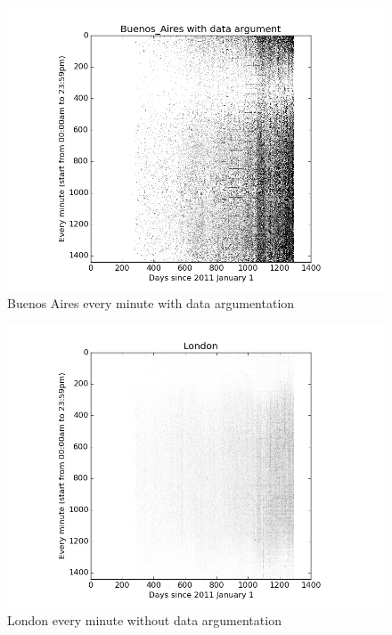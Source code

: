 \documentclass[a4paper,12pt]{article}
\begin{document}
\begin{figure}[H]
  \begin{center}
      \includegraphics[scale=0.8]{Buenos_Airesbinary.png}
\end{center}
\caption{Buenos Aires every minute with data argumentation}
 \label {fig:2}
 \end{figure}










\begin{figure}[H]
  \begin{center}
      \includegraphics[scale=0.8]{London.png}
\end{center}
\caption{London every minute without data argumentation}
 \label {fig:2}
 \end{figure}
\end{document}
